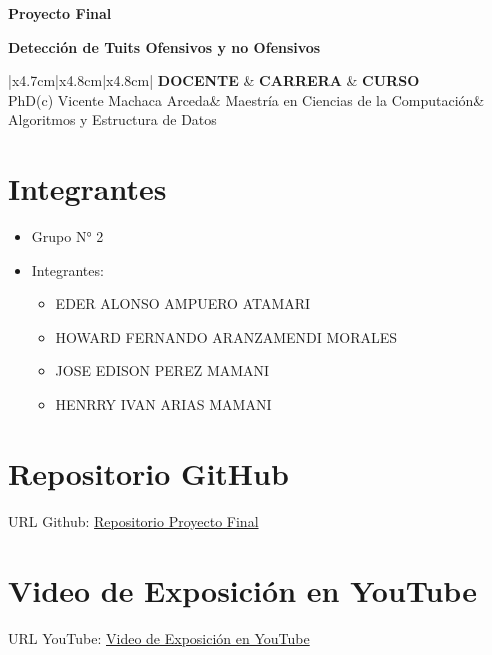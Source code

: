 \documentclass{article}
\newcommand{\csdocente}{PhD(c) Vicente Machaca Arceda}
\newcommand{\cscurso}{Algoritmos y Estructura de Datos}
\newcommand{\csescuela}{Maestría en Ciencias de la Computación}
\begin{document}
\vspace*{10px}

\begin{center}
	\fontsize{14}{14} \textbf{Proyecto Final}
\end{center}
\newline
\begin{center}
	\fontsize{17}{17} \textbf{Detección de Tuits Ofensivos y no Ofensivos}
\end{center}


\begin{table}[h]
	\begin{tabular}{|x{4.7cm}|x{4.8cm}|x{4.8cm}|}
		\hline
		\textbf{DOCENTE} & \textbf{CARRERA} & \textbf{CURSO} \\
		\hline
		\csdocente       & \csescuela       & \cscurso       \\
		\hline
	\end{tabular}
\end{table}

\section{Integrantes}
\begin{itemize}
	\item Grupo N° 2
	\item Integrantes:
	      \begin{itemize}
		      \item EDER ALONSO AMPUERO ATAMARI
		      \item HOWARD FERNANDO ARANZAMENDI MORALES
		      \item JOSE EDISON PEREZ MAMANI
		      \item HENRRY IVAN ARIAS MAMANI
	      \end{itemize}
\end{itemize}

\section{Repositorio GitHub}
URL Github: \href{https://github.com/hAriasm/ProyectoFinal}{Repositorio Proyecto Final}

\section{Video de Exposición en YouTube}
URL YouTube: \href{https://youtube.com}{Video de Exposición en YouTube}
\end{document}

